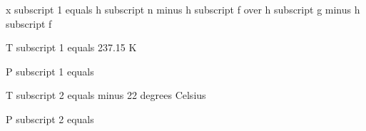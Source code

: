 x subscript 1 equals h subscript n minus h subscript f over h subscript g minus h subscript f

T subscript 1 equals 237.15 K

P subscript 1 equals

T subscript 2 equals minus 22 degrees Celsius

P subscript 2 equals